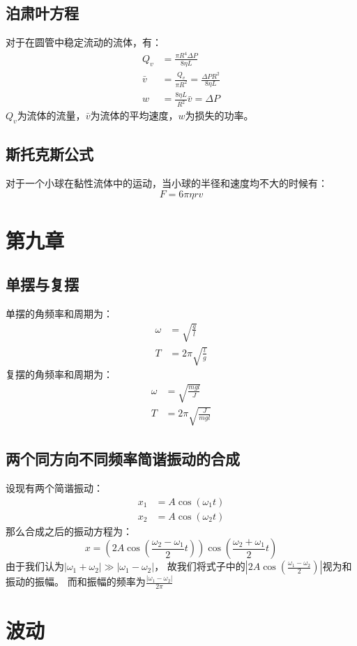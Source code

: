 \documentclass{ctexart}
\begin{document}
\subsection{泊肃叶方程}
对于在圆管中稳定流动的流体，有：
\begin{align*}
    Q_v &= \frac{\pi R^4 \Delta P}{8 \eta L} \\
    \bar{v} &= \frac{Q_v}{\pi R^2} = \frac{\Delta P R^2}{8 \eta L} \\
    w &= \frac{8\eta L}{R^2} \bar{v} = \Delta P
\end{align*}
$Q_v$为流体的流量，$\bar{v}$为流体的平均速度，$w$为损失的功率。
\subsection{斯托克斯公式}
对于一个小球在黏性流体中的运动，当小球的半径和速度均不大的时候有：
$$
    F = 6 \pi \eta r v 
$$
\section{第九章}
\subsection{单摆与复摆}
单摆的角频率和周期为：
\begin{align*}
    \omega &= \sqrt{\frac{g}{l}} \\
    T      &= 2\pi \sqrt{\frac{l}{g}}
\end{align*}
复摆的角频率和周期为：
\begin{align*}
    \omega &= \sqrt{\frac{mgl}{J}} \\
    T      &= 2\pi \sqrt{\frac{J}{mgl}}
\end{align*}
\subsection{两个同方向不同频率简谐振动的合成}
设现有两个简谐振动：
\begin{align*}
    x_1 &= A \cos(\omega_1 t ) \\
    x_2 &= A \cos(\omega_2 t )
\end{align*}
那么合成之后的振动方程为：
$$
    x = (2A \cos(\frac{\omega_2 - \omega_1}{2}t))\cos(\frac{\omega_2 + \omega_1}{2}t)
$$
由于我们认为$|\omega_1 + \omega_2| \gg |\omega_1 -\omega_2|$，
故我们将式子中的$|2A\cos(\frac{\omega_1 -\omega_2}{2})|$视为和振动的振幅。
而和振幅的频率为$\frac{|\omega_1-\omega_2|}{2\pi}$
\section{波动}
\end{document}
